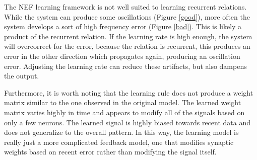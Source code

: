 \documentclass[12pt]{article}
\begin{document}
The NEF learning framework is not well suited to learning recurrent relations. While the system can produce some oscillations (Figure \ref{good}), more often the system develops a sort of high frequency error (Figure \ref{bad}). This is likely a product of the recurrent relation. If the learning rate is high enough, the system will overcorrect for the error, because the relation is recurrent, this produces an error in the other direction which propagates again, producing an oscillation error. Adjusting the learning rate can reduce these artifacts, but also dampens the output.



Furthermore, it is worth noting that the learning rule does not produce a weight matrix similar to the one observed in the original model. The learned weight matrix varies highly in time and appears to modify all of the signals based on only a few neurons. The learned signal is highly biased towards recent data and does not generalize to the overall pattern. In this way, the learning model is really just a more complicated feedback model, one that modifies synaptic weights based on recent error rather than modifying the signal itself.
\end{document}
